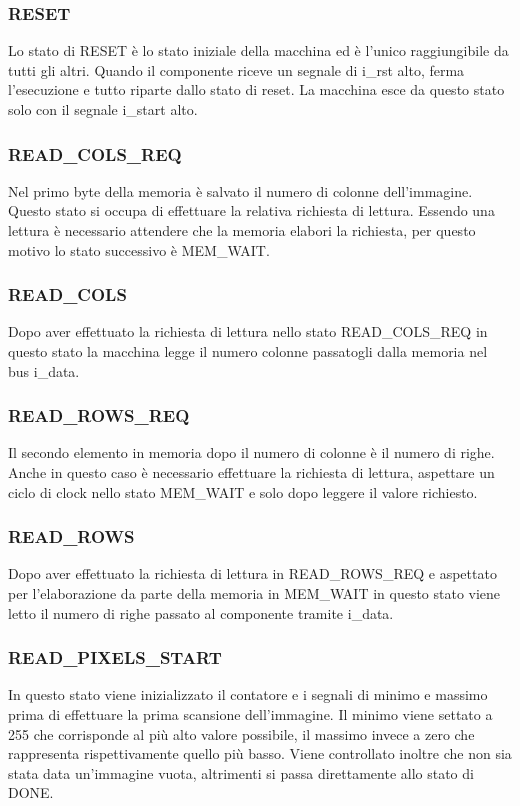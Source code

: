 \documentclass{article}
\begin{document}
\subsubsection{RESET}
Lo stato di RESET è lo stato iniziale della macchina ed è l'unico raggiungibile da tutti gli altri. Quando il componente riceve un segnale di i\_rst alto, ferma l'esecuzione e tutto riparte dallo stato di reset. La macchina esce da questo stato solo con il segnale i\_start alto.

\subsubsection{READ\_COLS\_REQ}
Nel primo byte della memoria è salvato il numero di colonne dell'immagine. Questo stato si occupa di effettuare la relativa richiesta di lettura. Essendo una lettura è necessario attendere che la memoria elabori la richiesta, per questo motivo lo stato successivo è MEM\_WAIT.

\subsubsection{READ\_COLS}
Dopo aver effettuato la richiesta di lettura nello stato READ\_COLS\_REQ in questo stato la macchina legge il numero colonne passatogli dalla memoria nel bus i\_data.

\subsubsection{READ\_ROWS\_REQ}
Il secondo elemento in memoria dopo il numero di colonne è il numero di righe. Anche in questo caso è necessario effettuare la richiesta di lettura, aspettare un ciclo di clock nello stato MEM\_WAIT e solo dopo leggere il valore richiesto.

\subsubsection{READ\_ROWS}
Dopo aver effettuato la richiesta di lettura in READ\_ROWS\_REQ e aspettato per l'elaborazione da parte della memoria in MEM\_WAIT in questo stato viene letto il numero di righe passato al componente tramite i\_data.

\subsubsection{READ\_PIXELS\_START}
In questo stato viene inizializzato il contatore  e i segnali di minimo e massimo prima di effettuare la prima scansione dell'immagine. Il minimo viene settato a 255 che corrisponde al più alto valore possibile, il massimo invece a zero che rappresenta rispettivamente quello più basso. Viene controllato inoltre che non sia stata data un'immagine vuota, altrimenti si passa direttamente allo stato di DONE.
\end{document}
